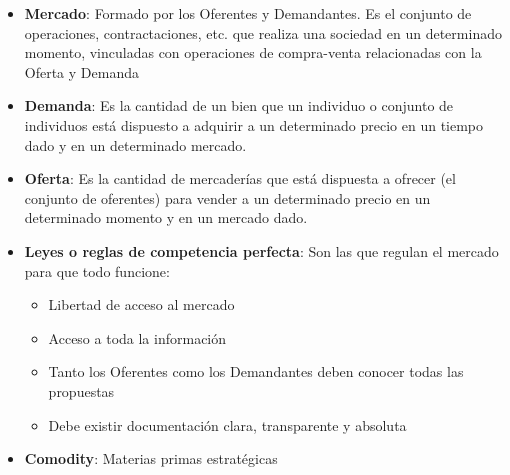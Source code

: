\documentclass[12pt,a4paper]{article}
\begin{document}
    \begin{itemize}
    	\item	\textbf{Mercado}: Formado por los Oferentes y Demandantes.
        			Es el conjunto de operaciones, contractaciones, etc. que realiza una sociedad en un determinado momento, vinculadas con operaciones de compra-venta relacionadas con la Oferta y Demanda
		\item	\textbf{Demanda}: Es la cantidad de un bien que un individuo o conjunto de individuos está dispuesto a adquirir a un determinado precio en un tiempo dado y en un determinado mercado.
        
        \item	\textbf{Oferta}: Es la cantidad de mercaderías que está dispuesta a ofrecer (el conjunto de oferentes) para vender a un determinado precio en un determinado momento y en un mercado dado.
        
        \item	\textbf{Leyes o reglas de competencia perfecta}: Son las que regulan el mercado para que todo funcione:
        		\begin{itemize}
					\item	Libertad de acceso al mercado
                    \item	Acceso a toda la información
                    \item	Tanto los Oferentes como los Demandantes deben conocer todas las propuestas
                    \item	Debe existir documentación clara, transparente y absoluta
				\end{itemize}
                
		\item	\textbf{Comodity}: Materias primas estratégicas
        
	\end{itemize}
    
    \begin{figure}[H]
    \centering
	\end{figure}
    
\end{document}
